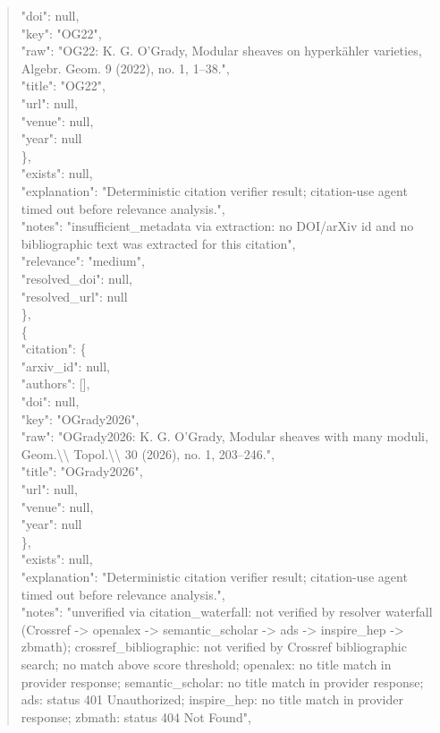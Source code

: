\documentclass[11pt]{article}
\begin{document}
\begin{quote}
        "doi": null,\\
        "key": "OG22",\\
        "raw": "OG22: K. G. O'Grady, Modular sheaves on hyperkähler varieties, Algebr. Geom. 9 (2022), no. 1, 1--38.",\\
        "title": "OG22",\\
        "url": null,\\
        "venue": null,\\
        "year": null\\
      \},\\
      "exists": null,\\
      "explanation": "Deterministic citation verifier result; citation-use agent timed out before relevance analysis.",\\
      "notes": "insufficient\_metadata via extraction: no DOI/arXiv id and no bibliographic text was extracted for this citation",\\
      "relevance": "medium",\\
      "resolved\_doi": null,\\
      "resolved\_url": null\\
    \},\\
    \{\\
      "citation": \{\\
        "arxiv\_id": null,\\
        "authors": [],\\
        "doi": null,\\
        "key": "OGrady2026",\\
        "raw": "OGrady2026: K. G. O'Grady, Modular sheaves with many moduli, Geom.\textbackslash{}\textbackslash{} Topol.\textbackslash{}\textbackslash{} 30 (2026), no. 1, 203--246.",\\
        "title": "OGrady2026",\\
        "url": null,\\
        "venue": null,\\
        "year": null\\
      \},\\
      "exists": null,\\
      "explanation": "Deterministic citation verifier result; citation-use agent timed out before relevance analysis.",\\
      "notes": "unverified via citation\_waterfall: not verified by resolver waterfall (Crossref -> openalex -> semantic\_scholar -> ads -> inspire\_hep -> zbmath); crossref\_bibliographic: not verified by Crossref bibliographic search; no match above score threshold; openalex: no title match in provider response; semantic\_scholar: no title match in provider response; ads: status 401 Unauthorized; inspire\_hep: no title match in provider response; zbmath: status 404 Not Found",\\

\end{quote}
\end{document}
